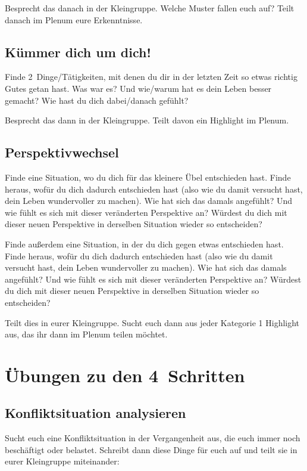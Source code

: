 Besprecht das danach in der Kleingruppe. Welche Muster fallen euch auf? Teilt danach im Plenum eure Erkenntnisse.

\subsection{Kümmer dich um dich!}

Finde 2~Dinge/Tätigkeiten, mit denen du dir in der letzten Zeit so etwas richtig Gutes getan hast. Was war es? Und wie/warum hat es dein Leben besser gemacht? Wie hast du dich dabei/danach gefühlt?

Besprecht das dann in der Kleingruppe. Teilt davon ein Highlight im Plenum.

\subsection{Perspektivwechsel}

Finde eine Situation, wo du dich für \glqq das kleinere Übel\grqq{} entschieden hast. Finde heraus, wofür du dich dadurch entschieden hast (also wie du damit versucht hast, dein Leben wundervoller zu machen). Wie hat sich das damals angefühlt? Und wie fühlt es sich mit dieser veränderten Perspektive an? Würdest du dich mit dieser neuen Perspektive in derselben Situation wieder so entscheiden?

Finde außerdem eine Situation, in der du dich gegen etwas entschieden hast. Finde heraus, wofür du dich dadurch entschieden hast (also wie du damit versucht hast, dein Leben wundervoller zu machen). Wie hat sich das damals angefühlt? Und wie fühlt es sich mit dieser veränderten Perspektive an? Würdest du dich mit dieser neuen Perspektive in derselben Situation wieder so entscheiden?

Teilt dies in eurer Kleingruppe. Sucht euch dann aus jeder Kategorie 1 Highlight aus, das ihr dann im Plenum teilen möchtet.


\section{Übungen zu den 4~Schritten}

\subsection{Konfliktsituation analysieren}

Sucht euch eine Konfliktsituation in der Vergangenheit aus, die euch immer noch beschäftigt oder belastet. Schreibt dann diese Dinge für euch auf und teilt sie in eurer Kleingruppe miteinander:

